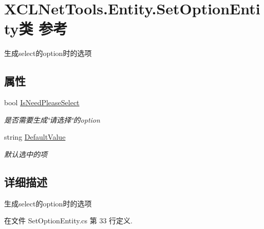 \hypertarget{class_x_c_l_net_tools_1_1_entity_1_1_set_option_entity}{\section{X\-C\-L\-Net\-Tools.\-Entity.\-Set\-Option\-Entity类 参考}
\label{class_x_c_l_net_tools_1_1_entity_1_1_set_option_entity}
}


生成select的option时的选项  


\subsection*{属性}
\begin{DoxyCompactItemize}
\item 
bool \hyperlink{class_x_c_l_net_tools_1_1_entity_1_1_set_option_entity_a22c7d14f09183bb9124fa9219663be6c}{Is\-Need\-Please\-Select}
\begin{DoxyCompactList}\small\item\em 是否需要生成\char`\"{}请选择\char`\"{}的option \end{DoxyCompactList}\item 
string \hyperlink{class_x_c_l_net_tools_1_1_entity_1_1_set_option_entity_a504fe6ad96f52cb7eb9f8a4e64e07723}{Default\-Value}
\begin{DoxyCompactList}\small\item\em 默认选中的项 \end{DoxyCompactList}\end{DoxyCompactItemize}


\subsection{详细描述}
生成select的option时的选项 



在文件 Set\-Option\-Entity.\-cs 第 33 行定义.



